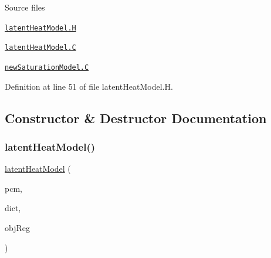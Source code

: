\label{_Description}%
 \begin{DoxyParagraph}{Source files}

\begin{DoxyItemize}
\item \href{../../../home/carlo/data/GeN-Foam/GeN-Foam_ffn/GeN-Foam/GeN-Foam/classes/thermalHydraulics/src/physicsModels/phaseChangeModels/latentHeatModels/latentHeatModel.H}{\tt latent\+Heat\+Model.\+H} 
\item \href{../../../home/carlo/data/GeN-Foam/GeN-Foam_ffn/GeN-Foam/GeN-Foam/classes/thermalHydraulics/src/physicsModels/phaseChangeModels/latentHeatModels/latentHeatModel.C}{\tt latent\+Heat\+Model.\+C} 
\item \href{../../../home/carlo/data/GeN-Foam/GeN-Foam_ffn/GeN-Foam/GeN-Foam/classes/thermalHydraulics/src/physicsModels/phaseChangeModels/latentHeatModels/newSaturationModel.C}{\tt new\+Saturation\+Model.\+C} 
\end{DoxyItemize}
\end{DoxyParagraph}


Definition at line 51 of file latent\+Heat\+Model.\+H.



\subsection{Constructor \& Destructor Documentation}
\mbox{\label{classFoam_1_1latentHeatModel_a304af178d9c3c943540b469e3189e95b}} 
\subsubsection{\texorpdfstring{latent\+Heat\+Model()}{latentHeatModel()}}
{\footnotesize\ttfamily \hyperlink{classFoam_1_1latentHeatModel}{latent\+Heat\+Model} (\begin{DoxyParamCaption}\item[{const \hyperlink{classFoam_1_1phaseChangeModel}{phase\+Change\+Model} \&}]{pcm,  }\item[{const dictionary \&}]{dict,  }\item[{const object\+Registry \&}]{obj\+Reg }\end{DoxyParamCaption})}



